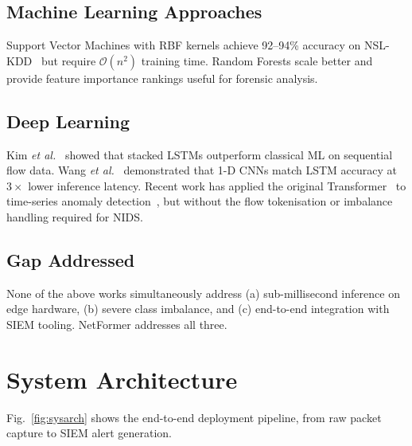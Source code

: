 \documentclass[conference]{IEEEtran}
\begin{document}
\subsection{Machine Learning Approaches}

Support Vector Machines with RBF kernels achieve 92--94\% accuracy on
NSL-KDD~\cite{ref:tsai2009} but require $\mathcal{O}(n^2)$ training
time. Random Forests scale better and provide feature importance
rankings useful for forensic analysis.

\subsection{Deep Learning}

Kim \textit{et al.}~\cite{ref:kim2016} showed that stacked LSTMs
outperform classical ML on sequential flow data. Wang
\textit{et al.}~\cite{ref:wang2017} demonstrated that 1-D CNNs match
LSTM accuracy at $3\times$ lower inference latency. Recent work has
applied the original Transformer~\cite{ref:vaswani2017} to time-series
anomaly detection~\cite{ref:xu2021}, but without the flow tokenisation
or imbalance handling required for NIDS.

\subsection{Gap Addressed}

None of the above works simultaneously address (a) sub-millisecond
inference on edge hardware, (b) severe class imbalance, and (c)
end-to-end integration with SIEM tooling. NetFormer addresses all
three.

\section{System Architecture}
\label{sec:system}

Fig.~\ref{fig:sysarch} shows the end-to-end deployment pipeline,
from raw packet capture to SIEM alert generation.
\end{document}
